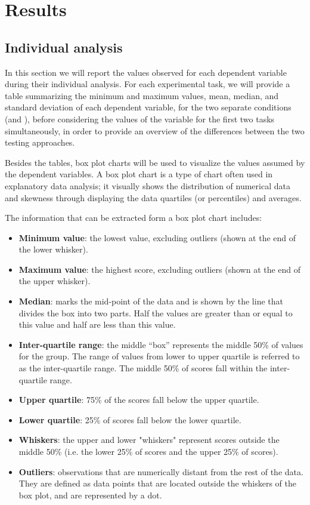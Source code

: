\section{Results}
\subsection{Individual analysis}
In this section we will report the values observed for each dependent variable during their individual analysis. For each experimental task, we will provide a table summarizing the minimum and maximum values, mean, median, and standard deviation of each dependent variable, for the two separate conditions (\ie \tdd and \notdd), before considering the values of the variable for the first two tasks simultaneously, in order to provide an overview of the differences between the two testing approaches.

Besides the tables, box plot charts will be used to visualize the values assumed by the dependent variables.
A box plot chart is a type of chart often used in explanatory data analysis; it visually shows the distribution of numerical data and skewness through displaying the data quartiles (or percentiles) and averages.

The information that can be extracted form a box plot chart includes:
\begin{itemize}
    \item \textbf{Minimum value}: the lowest value, excluding outliers (shown at the end of the lower whisker).
    \item \textbf{Maximum value}: the highest score, excluding outliers (shown at the end of the upper whisker).
    \item \textbf{Median}: marks the mid-point of the data and is shown by the line that divides the box into two parts. Half the values are greater than or equal to this value and half are less than this value.
    \item \textbf{Inter-quartile range}: the middle “box” represents the middle 50\% of values for the group. The range of values from lower to upper quartile is referred to as the inter-quartile range. The middle 50\% of scores fall within the inter-quartile range.
    \item \textbf{Upper quartile}: 75\% of the scores fall below the upper quartile.
    \item \textbf{Lower quartile}: 25\% of scores fall below the lower quartile.
    \item \textbf{Whiskers}: the upper and lower "whiskers" represent scores outside the middle 50\% (i.e. the lower 25\% of scores and the upper 25\% of scores).
    \item \textbf{Outliers}: observations that are numerically distant from the rest of the data. They are defined as data points that are located outside the whiskers of the box plot, and are represented by a dot.
\end{itemize}

